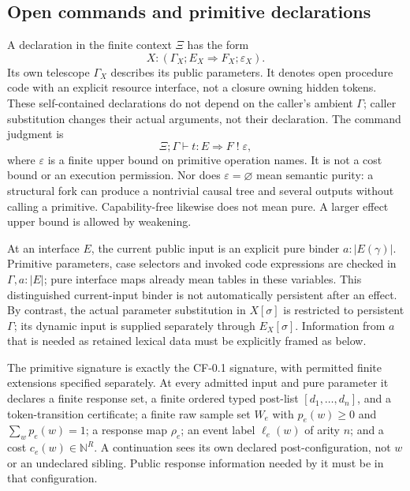 \documentclass[11pt,a4paper]{article}
\theoremstyle{definition}
\begin{document}
\subsection{Open commands and primitive declarations}
A declaration in the finite context $\Xi$ has the form
\[
 X:(\Gamma_X;E_X\Rightarrow F_X;\varepsilon_X).
\]
Its own telescope $\Gamma_X$ describes its public parameters. It denotes
open procedure code with an explicit resource interface, not a closure
owning hidden tokens. These self-contained declarations do not depend on
the caller's ambient $\Gamma$; caller substitution changes their actual
arguments, not their declaration. The command judgment is
\[
 \Xi;\Gamma\vdash t:E\Rightarrow F\;!\;\varepsilon,
\]
where $\varepsilon$ is a finite upper bound on primitive operation names.
It is not a cost bound or an execution permission. Nor does
$\varepsilon=\varnothing$ mean semantic purity: a structural fork can
produce a nontrivial causal tree and several outputs without calling a
primitive. Capability-free likewise does not mean pure. A larger effect upper
bound is allowed by weakening.

At an interface $E$, the current public input is an explicit pure binder
$a:|E(\gamma)|$. Primitive parameters, case selectors and invoked code
expressions are checked in $\Gamma,a:|E|$; pure interface maps already
mean tables in these variables. This distinguished current-input binder
is not automatically persistent after an effect. By contrast, the actual
parameter substitution in $X[\sigma]$ is restricted to persistent
$\Gamma$; its dynamic input is supplied separately through $E_X[\sigma]$.
Information from $a$ that is needed as retained lexical data must be
explicitly framed as below.

The primitive signature is exactly the CF-0.1 signature, with permitted
finite extensions specified separately. At every admitted input and pure
parameter it declares a finite response set, a finite ordered typed
post-list $[d_1,\ldots,d_n]$, and a token-transition certificate; a finite
raw sample set $W_e$ with $p_e(w)\ge0$ and $\sum_wp_e(w)=1$; a response
map $\rho_e$; an event label $\ell_e(w)$ of arity $n$; and a cost
$c_e(w)\in\mathbb N^R$. A continuation sees its own declared post-configuration,
not $w$ or an undeclared sibling. Public response information needed by it
must be in that configuration.
\end{document}
